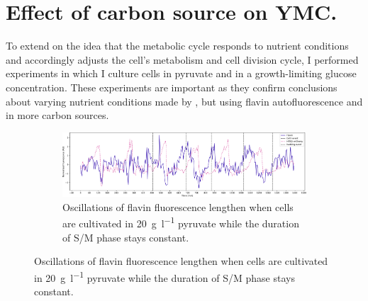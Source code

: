 \section{Effect of carbon source on YMC.}
\label{sec:biology-carbon}

To extend on the idea that the metabolic cycle responds to nutrient conditions and accordingly adjusts the cell's metabolism and cell division cycle, I performed experiments in which I culture cells in pyruvate and in a growth-limiting glucose concentration.
These experiments are important as they confirm conclusions about varying nutrient conditions made by \textcite{papagiannakisAutonomousMetabolicOscillations2017}, but using flavin autofluorescence and in more carbon sources.

\begin{figure}
  \centering
  \begin{subfigure}[htpb]{1.0\textwidth}
   \centering
   \includegraphics[width=\textwidth]{pyruvate_single_birth_plot_edit.pdf}
   \caption{
     Oscillations of flavin fluorescence lengthen when cells are cultivated in \SI{20}{\gram~\litre^{-1}} pyruvate while the duration of S/M phase stays constant.
   }
   \label{fig:biology-pyruvate-single}


\end{subfigure}
\end{figure}
